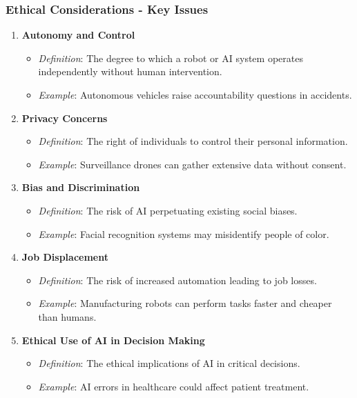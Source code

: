\documentclass{beamer}
\begin{document}
\begin{frame}[fragile]
    \frametitle{Ethical Considerations - Key Issues}
    \begin{enumerate}
        \item \textbf{Autonomy and Control}
        \begin{itemize}
            \item \textit{Definition}: The degree to which a robot or AI system operates independently without human intervention.
            \item \textit{Example}: Autonomous vehicles raise accountability questions in accidents.
        \end{itemize}
        
        \item \textbf{Privacy Concerns}
        \begin{itemize}
            \item \textit{Definition}: The right of individuals to control their personal information.
            \item \textit{Example}: Surveillance drones can gather extensive data without consent.
        \end{itemize}

        \item \textbf{Bias and Discrimination}
        \begin{itemize}
            \item \textit{Definition}: The risk of AI perpetuating existing social biases.
            \item \textit{Example}: Facial recognition systems may misidentify people of color.
        \end{itemize}
        
        \item \textbf{Job Displacement}
        \begin{itemize}
            \item \textit{Definition}: The risk of increased automation leading to job losses.
            \item \textit{Example}: Manufacturing robots can perform tasks faster and cheaper than humans.
        \end{itemize}
        
        \item \textbf{Ethical Use of AI in Decision Making}
        \begin{itemize}
            \item \textit{Definition}: The ethical implications of AI in critical decisions.
            \item \textit{Example}: AI errors in healthcare could affect patient treatment.
        \end{itemize}
    \end{enumerate}
\end{frame}
\end{document}
